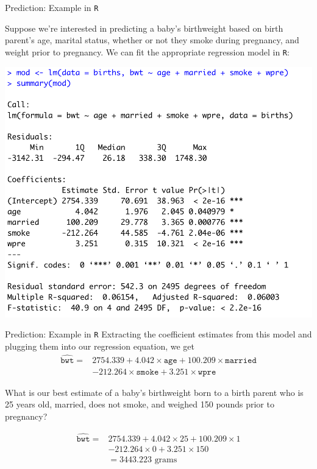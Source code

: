 \documentclass[10pt,t]{beamer}
\begin{document}
\begin{frame}{Prediction: Example in \texttt{R}}

Suppose we're interested in predicting a baby's birthweight based on birth parent's age, marital status, whether or not they smoke during pregnancy, and weight prior to pregnancy. We can fit the appropriate regression model in \texttt{R}:

\vspace{0.2cm}

\centering \includegraphics[scale=0.35]{figures/predict_reg.png}
\end{frame}

\begin{frame}{Prediction: Example in \texttt{R}}
Extracting the coefficient estimates from this model and plugging them into our regression equation, we get
\begin{align*}
\widehat{\texttt{bwt}} = & 2754.339 + 4.042 \times \texttt{age} + 100.209 \times \texttt{married} \\
& - 212.264 \times \texttt{smoke} + 3.251 \times \texttt{wpre} 
\end{align*} \pause

What is our best estimate of a baby's birthweight born to a birth parent who is 25 years old, married, does not smoke, and weighed 150 pounds prior to pregnancy? \pause

\begin{align*}
\widehat{\texttt{bwt}} = & 2754.339 + 4.042 \times 25 + 100.209 \times 1 \\
& - 212.264 \times 0 + 3.251 \times 150  \\
& = 3443.223 \text{ grams}
\end{align*}

\end{frame}
\end{document}
